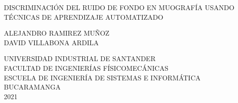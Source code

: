 
\thispagestyle{empty}

\begin{center}

DISCRIMINACIÓN DEL RUIDO DE FONDO EN MUOGRAFÍA USANDO TÉCNICAS DE APRENDIZAJE AUTOMATIZADO \vspace{6cm}

ALEJANDRO RAMIREZ MUÑOZ\\DAVID VILLABONA ARDILA
\vspace{6cm}

UNIVERSIDAD INDUSTRIAL DE SANTANDER\\
FACULTAD DE INGENIERÍAS FÍSICOMECÁNICAS\\
ESCUELA DE INGENIERÍA DE SISTEMAS E INFORMÁTICA\\
BUCARAMANGA\\
2021\\

\end{center}


\newpage
\thispagestyle{empty}


